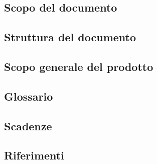 \subsection{Scopo del documento}\label{sec:Scopo-documento}


\subsection{Struttura del documento}\label{sec:Struttura-documento}

    
\subsection{Scopo generale del prodotto}\label{sec:Scopo-prodotto}


\subsection{Glossario}\label{sec:Glossario}


\subsection{Scadenze}\label{sec:Scadenze}
  

\subsection{Riferimenti}\label{sec:Riferimenti}
  
    